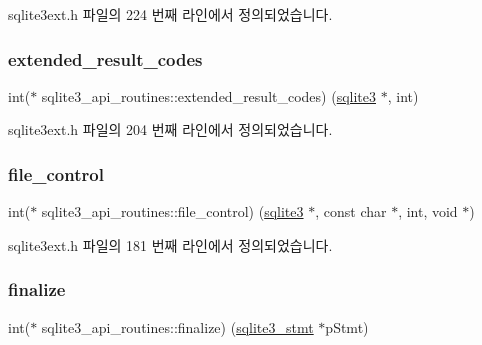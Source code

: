 sqlite3ext.\+h 파일의 224 번째 라인에서 정의되었습니다.

\mbox{\label{structsqlite3__api__routines_afbe050a2c8ff2d13c27e8756e753cf86}} 
\subsubsection{\texorpdfstring{extended\+\_\+result\+\_\+codes}{extended\_result\_codes}}
{\footnotesize\ttfamily int($\ast$ sqlite3\+\_\+api\+\_\+routines\+::extended\+\_\+result\+\_\+codes) (\hyperlink{sqlite3_8h_a0ef6f2646262c8a9b24368d8ac140f69}{sqlite3} $\ast$, int)}



sqlite3ext.\+h 파일의 204 번째 라인에서 정의되었습니다.

\mbox{\label{structsqlite3__api__routines_a629c5e5c03b3223242357282c84af46d}} 
\subsubsection{\texorpdfstring{file\+\_\+control}{file\_control}}
{\footnotesize\ttfamily int($\ast$ sqlite3\+\_\+api\+\_\+routines\+::file\+\_\+control) (\hyperlink{sqlite3_8h_a0ef6f2646262c8a9b24368d8ac140f69}{sqlite3} $\ast$, const char $\ast$, int, void $\ast$)}



sqlite3ext.\+h 파일의 181 번째 라인에서 정의되었습니다.

\mbox{\label{structsqlite3__api__routines_a0bbe0b1cdd61a2e7e089ad1e42978f6f}} 
\subsubsection{\texorpdfstring{finalize}{finalize}}
{\footnotesize\ttfamily int($\ast$ sqlite3\+\_\+api\+\_\+routines\+::finalize) (\hyperlink{sqlite3_8h_af2a033da1327cdd77f0a174a09aedd0c}{sqlite3\+\_\+stmt} $\ast$p\+Stmt)}



